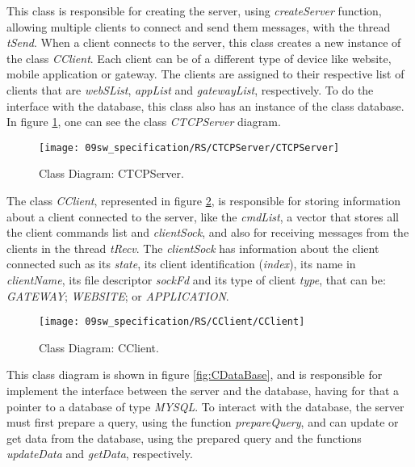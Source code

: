 
This class is responsible for creating the server, using \textit{createServer} function, allowing multiple clients to connect and send them messages, with the thread \textit{tSend}. When a client connects to the server, this class creates a new instance of the class \textit{CClient}. Each client can be of a different type of device like website, mobile application or gateway. The clients are assigned to their respective list of clients that are \textit{webSList}, \textit{appList} and \textit{gatewayList}, respectively. To do the interface with the database, this class also has an instance of the class database. In figure \ref{fig:CTCPServer}, one can see the class \textit{CTCPServer} diagram.

\begin{figure}[H]
	\centering
	\texttt{[image: 09sw\_specification/RS/CTCPServer/CTCPServer]}
	\caption{Class Diagram: CTCPServer.}
	\label{fig:CTCPServer}
\end{figure}


The class \textit{CClient}, represented in figure \ref{fig:CClient}, is responsible for storing information about a client connected to the server, like the \textit{cmdList}, a vector that stores all the client commands list and \textit{clientSock}, and also for receiving messages from the clients in the thread \textit{tRecv}. The \textit{clientSock} has information about the client connected such as its \textit{state}, its client identification (\textit{index}), its name in \textit{clientName}, its file descriptor \textit{sockFd} and its type of client \textit{type}, that can be: \textit{GATEWAY}; \textit{WEBSITE}; or \textit{APPLICATION}.

\begin{figure}[H]
	\centering
	\texttt{[image: 09sw\_specification/RS/CClient/CClient]}
	\caption{Class Diagram: CClient.}
	\label{fig:CClient}
\end{figure}


This class diagram is shown in figure \ref{fig:CDataBase}, and is responsible for implement the interface between the server and the database, having for that a pointer to a database of type \textit{MYSQL}. To interact with the database, the server must first prepare a query, using the function \textit{prepareQuery}, and can update or get data from the database, using the prepared query and the functions \textit{updateData} and \textit{getData}, respectively.


